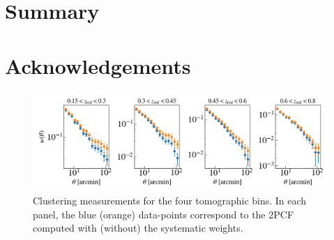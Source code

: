 \documentclass[fleqn,usenatbib,useAMS]{mnras}
\begin{document}
\section{Summary}\label{sec:summary} 





\section*{Acknowledgements}












\begin{figure}
\includegraphics[width=\textwidth]{figures_tmp/xi.png}
\caption{\label{fig:xi} Clustering measurements for the four tomographic bins. In each panel, the blue (orange) data-points correspond to the 2PCF computed with (without) the systematic weights.} 
\end{figure}
\end{document}
